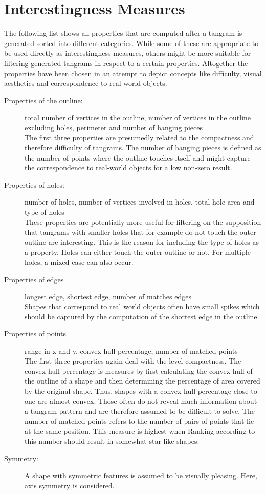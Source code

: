 \section{Interestingness Measures}
\label{interesting}
The following list shows all properties that are computed after a tangram is generated sorted into different categories. While some of these are appropriate to be used directly as interestingness measures, others might be more suitable for filtering generated tangrams in respect to a certain properties. Altogether the properties have been chosen in an attempt to depict concepts like difficulty, visual aesthetics and correspondence to real world objects. 
\begin{description}
  \item[Properties of the outline:] total number of vertices in the outline, number of vertices in the outline excluding holes, perimeter and number of hanging pieces \\
  	The first three properties are presumedly related to the compactness and therefore difficulty of tangrams. The number of hanging pieces is defined as the number of points where the outline touches itself and might capture the correspondence to real-world objects for a low non-zero result. 
  \item[Properties of holes:] number of holes, number of vertices involved in holes, total hole area and type of holes \\
  	These properties are potentially more useful for filtering on the supposition that tangrams with smaller holes that for example do not touch the outer outline are interesting. This is the reason for including the type of holes as a property. Holes can either touch the outer outline or not. For multiple holes, a mixed case can also occur.  
  \item[Properties of edges] longest edge, shortest edge, number of matches edges \\
  	Shapes that correspond to real world objects often have small spikes which should be captured by the computation of the shortest edge in the outline.
  \item[Properties of points] range in x and y, convex hull percentage, number of matched points \\
  	The first three properties again deal with the level compactness. The convex hull percentage is measures by first calculating the convex hull of the outline of a shape and then determining the percentage of area covered by the original shape. Thus, shapes with a convex hull percentage close to one are almost convex. Those often do not reveal much information about a tangram pattern and are therefore assumed to be difficult to solve. 
  	The number of matched points refers to the number of pairs of points that lie at the same position. This measure is highest when  Ranking according to this number should result in somewhat star-like shapes. 
   \item[Symmetry:] A shape with symmetric features is assumed to be visually pleasing. Here, axis symmetry is considered. 
\end{description}

